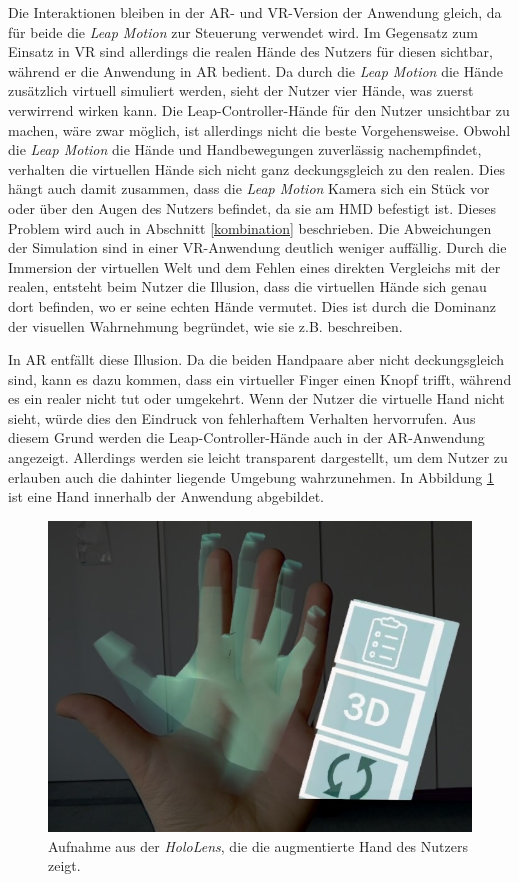Die Interaktionen bleiben in der AR- und VR-Version der Anwendung gleich, da für beide die \textit{Leap Motion} zur Steuerung verwendet wird.
Im Gegensatz zum Einsatz in VR sind allerdings die realen Hände des Nutzers für diesen sichtbar, während er die Anwendung in AR bedient. Da durch die \textit{Leap Motion} die Hände zusätzlich virtuell simuliert werden, sieht der Nutzer vier Hände, was zuerst verwirrend wirken kann. 
Die Leap-Controller-Hände für den Nutzer unsichtbar zu machen, wäre zwar möglich, ist allerdings nicht die beste Vorgehensweise. Obwohl die \textit{Leap Motion} die Hände und Handbewegungen zuverlässig nachempfindet, verhalten die virtuellen Hände sich nicht ganz deckungsgleich zu den realen. Dies hängt auch damit zusammen, dass die \textit{Leap Motion} Kamera sich ein Stück vor oder über den Augen des Nutzers befindet, da sie am HMD befestigt ist. Dieses Problem wird auch in Abschnitt \ref{kombination} beschrieben.
Die Abweichungen der Simulation sind in einer VR-Anwendung deutlich weniger auffällig. Durch die Immersion der virtuellen Welt und dem Fehlen eines direkten Vergleichs mit der realen, entsteht beim Nutzer die Illusion, dass die virtuellen Hände sich genau dort befinden, wo er seine echten Hände vermutet. Dies ist durch die Dominanz der visuellen Wahrnehmung begründet, wie sie z.B. \cite{Azmandian16} beschreiben.

In AR entfällt diese Illusion. Da die beiden Handpaare aber nicht deckungsgleich sind, kann es dazu kommen, dass ein virtueller Finger einen Knopf trifft, während es ein realer nicht tut oder umgekehrt. Wenn der Nutzer die virtuelle Hand nicht sieht, würde dies den Eindruck von fehlerhaftem Verhalten hervorrufen. 
Aus diesem Grund werden die Leap-Controller-Hände auch in der AR-Anwendung angezeigt. Allerdings werden sie leicht transparent dargestellt, um dem Nutzer zu erlauben auch die dahinter liegende Umgebung wahrzunehmen. 
In Abbildung \ref{img:arHands} ist eine Hand innerhalb der Anwendung abgebildet.

\begin{figure}[!htb]
	\centering
	\includegraphics[width=0.5\linewidth]{images/AR_hand.jpg}
	\caption{Aufnahme aus der \textit{HoloLens}, die die augmentierte Hand des Nutzers zeigt.}
	\label{img:arHands}
\end{figure}
\FloatBarrier


